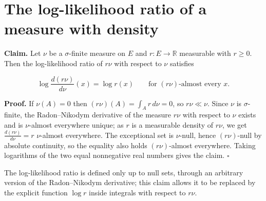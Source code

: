\documentclass[11pt,a4paper]{article}
\begin{document}
\section{\texorpdfstring{The log-likelihood ratio of a measure with density}{The log-likelihood ratio of a measure with density}}


\textbf{Claim.} Let \(\nu\) be a \(\sigma\)-finite measure on \(E\) and \(r:E\to\mathbb R\) measurable with \(r\ge0\). Then the log-likelihood ratio of \(r\nu\) with respect to \(\nu\) satisfies


\[\log\frac{d(r\nu)}{d\nu}(x)=\log r(x)\qquad\text{for }(r\nu)\text{-almost every }x.\]


\textbf{Proof.} If \(\nu(A)=0\) then \((r\nu)(A)=\int_Ar\,d\nu=0\), so \(r\nu\ll\nu\). Since \(\nu\) is \(\sigma\)-finite, the Radon–Nikodym derivative of the measure \(r\nu\) with respect to \(\nu\) exists and is \(\nu\)-almost everywhere unique; as \(r\) is a measurable density of \(r\nu\), we get \(\frac{d(r\nu)}{d\nu}=r\) \(\nu\)-almost everywhere. The exceptional set is \(\nu\)-null, hence \((r\nu)\)-null by absolute continuity, so the equality also holds \((r\nu)\)-almost everywhere. Taking logarithms of the two equal nonnegative real numbers gives the claim. \(\square\)




The log-likelihood ratio is defined only up to null sets, through an arbitrary version of the Radon–Nikodym derivative; this claim allows it to be replaced by the explicit function \(\log r\) inside integrals with respect to \(r\nu\).
\end{document}
